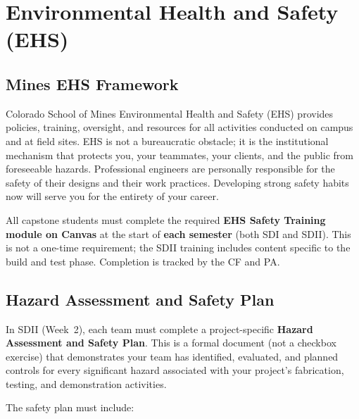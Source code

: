 \chapter{Environmental Health and Safety (EHS)}

\section{Mines EHS Framework}
Colorado School of Mines Environmental Health and Safety (EHS) provides policies, training, oversight, and resources for all activities conducted on campus and at field sites. EHS is not a bureaucratic obstacle; it is the institutional mechanism that protects you, your teammates, your clients, and the public from foreseeable hazards. Professional engineers are personally responsible for the safety of their designs and their work practices. Developing strong safety habits now will serve you for the entirety of your career.

All capstone students must complete the required \textbf{EHS Safety Training module on Canvas} at the start of \textbf{each semester} (both SDI and SDII). This is not a one-time requirement; the SDII training includes content specific to the build and test phase. Completion is tracked by the CF and PA.

\section{Hazard Assessment and Safety Plan}
In SDII (Week~2), each team must complete a project-specific \textbf{Hazard Assessment and Safety Plan}. This is a formal document (not a checkbox exercise) that demonstrates your team has identified, evaluated, and planned controls for every significant hazard associated with your project's fabrication, testing, and demonstration activities.

The safety plan must include:

